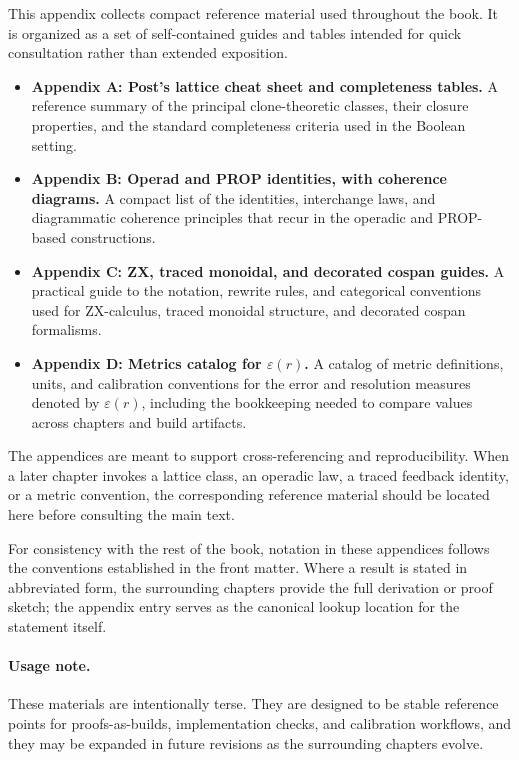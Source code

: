 This appendix collects compact reference material used throughout the book. It is organized as a set of self-contained guides and tables intended for quick consultation rather than extended exposition.

\begin{itemize}
  \item \textbf{Appendix A: Post's lattice cheat sheet and completeness tables.} A reference summary of the principal clone-theoretic classes, their closure properties, and the standard completeness criteria used in the Boolean setting.
  \item \textbf{Appendix B: Operad and PROP identities, with coherence diagrams.} A compact list of the identities, interchange laws, and diagrammatic coherence principles that recur in the operadic and PROP-based constructions.
  \item \textbf{Appendix C: ZX, traced monoidal, and decorated cospan guides.} A practical guide to the notation, rewrite rules, and categorical conventions used for ZX-calculus, traced monoidal structure, and decorated cospan formalisms.
  \item \textbf{Appendix D: Metrics catalog for $\varepsilon(r)$.} A catalog of metric definitions, units, and calibration conventions for the error and resolution measures denoted by $\varepsilon(r)$, including the bookkeeping needed to compare values across chapters and build artifacts.
\end{itemize}

The appendices are meant to support cross-referencing and reproducibility. When a later chapter invokes a lattice class, an operadic law, a traced feedback identity, or a metric convention, the corresponding reference material should be located here before consulting the main text.

For consistency with the rest of the book, notation in these appendices follows the conventions established in the front matter. Where a result is stated in abbreviated form, the surrounding chapters provide the full derivation or proof sketch; the appendix entry serves as the canonical lookup location for the statement itself.

\paragraph{Usage note.} These materials are intentionally terse. They are designed to be stable reference points for proofs-as-builds, implementation checks, and calibration workflows, and they may be expanded in future revisions as the surrounding chapters evolve.

